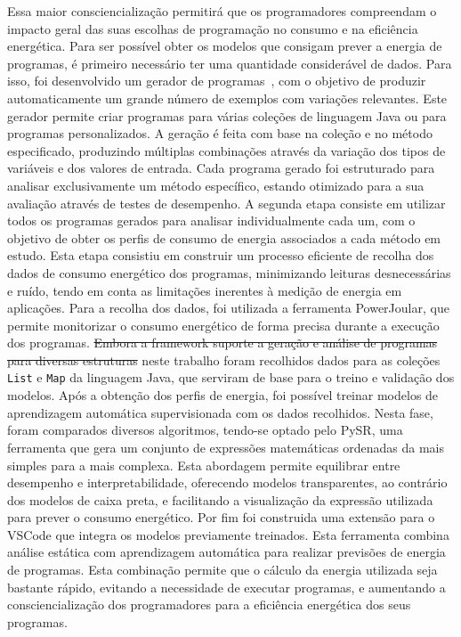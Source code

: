 Essa maior consciencialização permitirá que os programadores compreendam o impacto geral das suas escolhas de programação no consumo e na eficiência energética.
Para ser possível obter os modelos que consigam prever a energia de programas, é primeiro necessário ter uma quantidade considerável de dados. Para isso, foi desenvolvido um gerador de programas~, com o objetivo de produzir automaticamente um grande número de exemplos com variações relevantes.
Este gerador permite criar programas para várias coleções de linguagem Java ou para programas personalizados. A geração é feita com base na coleção e no método especificado, produzindo múltiplas combinações através da variação dos tipos de variáveis e dos valores de entrada. Cada programa gerado foi estruturado para analisar exclusivamente um método específico, estando otimizado para a sua avaliação através de testes de desempenho.
A segunda etapa consiste em utilizar todos os programas gerados para analisar individualmente cada um, com o objetivo de obter os perfis de consumo de energia associados a cada método em estudo. Esta etapa consistiu em construir um processo eficiente de recolha dos dados de consumo energético dos programas, minimizando leituras desnecessárias e ruído, tendo em conta as limitações inerentes à medição de energia em aplicações. Para a recolha dos dados, foi utilizada a ferramenta PowerJoular, que permite monitorizar o consumo energético de forma precisa durante a execução dos programas.
\st{Embora a framework suporte a geração e análise de programas para diversas estruturas}  neste trabalho foram recolhidos dados para as coleções \texttt{List} e \texttt{Map} da linguagem Java, que serviram de base para o treino e validação dos modelos.
Após a obtenção dos perfis de energia, foi possível treinar modelos de aprendizagem automática supervisionada com os dados recolhidos. Nesta fase, foram comparados diversos algoritmos, tendo-se optado pelo PySR, uma ferramenta que gera um conjunto de expressões matemáticas ordenadas da mais simples para a mais complexa. Esta abordagem permite equilibrar entre desempenho e interpretabilidade, oferecendo modelos transparentes, ao contrário dos modelos de caixa preta, e facilitando a visualização da expressão utilizada para prever o consumo energético.
Por fim foi construida uma extensão para o VSCode que integra os modelos previamente treinados. Esta ferramenta combina análise estática com aprendizagem automática para realizar previsões de energia de programas. Esta combinação permite que o cálculo da energia utilizada seja bastante rápido, evitando a necessidade de executar programas, e aumentando a consciencialização dos programadores para a eficiência energética dos seus programas.
